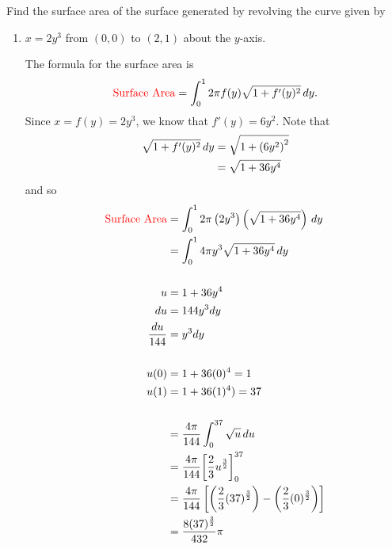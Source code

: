 \documentclass[noinstructornotes]{ximera}
\begin{document}
\begin{problem}
Find the surface area of the surface generated by revolving the curve given by
	\begin{enumerate}
			\item  $x = 2y^3$ from $\left( 0, 0 \right)$ to $\left( 2, 1 \right)$ about the $y$-axis.
		\begin{freeResponse}
		The formula for the surface area is
			\[
			\text{{\color{red} Surface Area}} = \int_0^{1} 2 \pi f(y) \sqrt{1+f'(y)^2} \,d y.
			\]
		Since $x = f(y) = 2y^3$, 
		we know that $f'(y) = 6y^2$.  
		Note that
			\begin{align*}
			\sqrt{1+f'(y)^2} \,d y  &= \sqrt{1+ \left( 6y^2 \right)^2}  \\
			&=  \sqrt{1+ 36y^4}  \\
			\end{align*}
		and so
			\begin{align*}
			\text{{\color{red} Surface Area}} &= \int_0^{1} 2 \pi \left(2y^3\right) \left(  \sqrt{1+ 36y^4} \right) \,d y  \\
			&= \int_0^{1} 4 \pi y^3  \sqrt{1+ 36y^4}  \,d y \\
			& \\
			u&=1+ 36y^4 \\
			du &= 144y^3dy \\
			\frac{du}{144} &= y^3dy \\
			& \\
			u(0)&=1+36(0)^4 = 1\\
			u(1)&= 1+ 36(1)^4) = 37 \\
			& \\
			&= \frac{4 \pi}{144} \int_0^{37}  \sqrt{u}  \,d u \\
			&= \frac{4 \pi}{144} \bigg[ \frac{2}{3}u^{\frac{3}{2}} \bigg]_0^{37}\\
			&= \frac{4 \pi}{144} \left[ \left( \frac{2}{3}(37)^{\frac{3}{2}} \right) - \left( \frac{2}{3}(0)^{\frac{3}{2}} \right) \right]  \\
			&= \frac{8(37)^{\frac{3}{2}} }{432}\pi
			\end{align*}
	
		\end{freeResponse}
	

\end{enumerate}
\end{problem}
\end{document}
